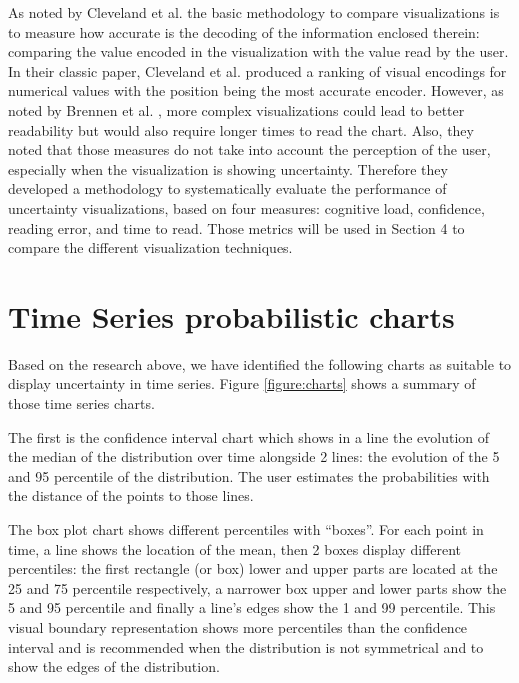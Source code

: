 \documentclass[a4paper,3p,sort&compress]{elsarticle}
\begin{document}
As noted by Cleveland et al. \cite{cleveland_graphical_1984} the basic
methodology to compare visualizations is to measure how accurate is the decoding
of the information enclosed therein: comparing the value encoded in the
visualization with the value read by the user. In their classic paper, Cleveland
et al. \cite{cleveland_graphical_1984} produced a ranking of visual encodings
for numerical values with the position being the most accurate encoder. However,
as noted by Brennen et al. \cite{brennen_instrument_2018}, more complex
visualizations could lead to better readability but would also require longer
times to read the chart. Also, they noted that those measures do not take into
account the perception of the user, especially when the visualization is showing
uncertainty. Therefore they developed a methodology to systematically evaluate
the performance of uncertainty visualizations, based on four measures: cognitive
load, confidence, reading error, and time to read. Those metrics will be used in
Section 4 to compare the different visualization techniques.

\section{Time Series probabilistic charts}
\label{sec:time_series}

Based on the research above, we have identified the following charts as suitable to display
uncertainty in time series. Figure \ref{figure:charts} shows a summary of those time series charts.

The first is the confidence interval chart which shows in a line the evolution of the
median of the distribution
 over time alongside 2 lines: the evolution of the 5 and 95 percentile of the distribution.
 The user estimates the probabilities with the distance of the points to those lines.

The box plot chart shows different percentiles with “boxes”. For each point in time, a
line shows the location of the mean, then 2 boxes display different percentiles: the
first rectangle (or box) lower and upper parts are located
at the 25 and 75 percentile respectively, a narrower box upper and lower parts show
the 5 and 95 percentile and finally a line’s edges show the 1 and 99 percentile.
This visual boundary representation shows more percentiles than the confidence interval and
is recommended when the distribution is not symmetrical and to show the edges of the distribution.
\end{document}
